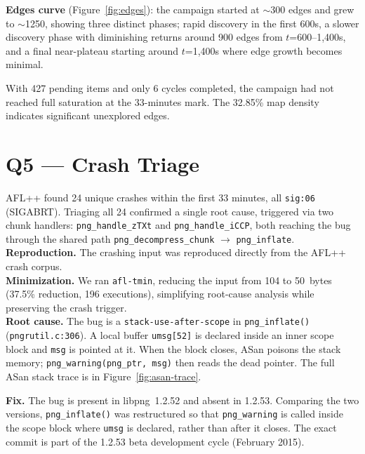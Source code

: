 \documentclass[letterpaper,twocolumn,10pt]{article}
\begin{document}
\textbf{Edges curve} (Figure~\ref{fig:edges}): the campaign started
at $\sim$300 edges and grew to $\sim$1250, showing three distinct phases; rapid discovery in the first 600s, a slower discovery phase with diminishing
returns around 900 edges from $t$=600--1{,}400s, and a final near-plateau
starting around $t$=1{,}400s where edge growth becomes minimal.

With 427 pending items and only 6 cycles completed, the campaign had
not reached full saturation at the 33-minutes mark. The 32.85\% map
density indicates significant unexplored edges.

\section{Q5 --- Crash Triage}
\label{sec:q5}

AFL++ found 24 unique crashes within the first 33 minutes, all
\texttt{sig:06} (SIGABRT). Triaging all 24 confirmed a single root
cause, triggered via two chunk handlers: \texttt{png\_handle\_zTXt} and \texttt{png\_handle\_iCCP}, both reaching the bug through the shared path
\texttt{png\_decompress\_chunk} $\rightarrow$ \texttt{png\_inflate}.
\newline
\\
\textbf{Reproduction.} The crashing input was reproduced directly
from the AFL++ crash corpus.
\newline
\\
\textbf{Minimization.} We ran \texttt{afl-tmin}, reducing the input
from 104 to 50~bytes (37.5\% reduction, 196 executions), simplifying
root-cause analysis while preserving the crash trigger.
\newline
\\
\textbf{Root cause.} The bug is a \texttt{stack-use-after-scope} in
\texttt{png\_inflate()} (\texttt{pngrutil.c:306}). A local buffer
\texttt{umsg[52]} is declared inside an inner scope block and
\texttt{msg} is pointed at it. When the block closes, ASan poisons
the stack memory; \texttt{png\_warning(png\_ptr,~msg)} then reads the
dead pointer. The full ASan stack trace is in
Figure~\ref{fig:asan-trace}.

{\small

}
\noindent
\textbf{Fix.} The bug is present in libpng~1.2.52 and absent in 1.2.53. Comparing the two versions, \texttt{png\_inflate()} was restructured so that \texttt{png\_warning} is called inside the scope block where \texttt{umsg} is declared, rather than after it closes. The exact commit is part of the 1.2.53 beta development cycle (February 2015).
\end{document}
